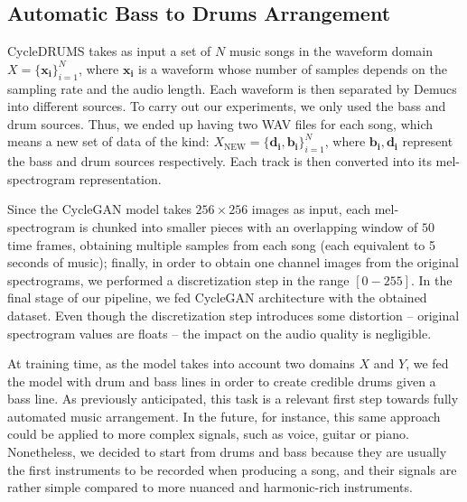 \documentclass[journal]{IEEEtran}
\begin{document}

\subsection{Automatic Bass to Drums Arrangement}

CycleDRUMS takes as input a set of $N$ music songs in the waveform domain $X = \{\mathbf{x_{i}}\}_{i=1}^{N}$, where $\mathbf{x_i}$ is a waveform whose number of samples depends on the sampling rate and the audio length. %
Each waveform is then separated by Demucs into different sources. To carry out our experiments, we only used the bass and drum sources. Thus, we ended up having two WAV files for each song, which means a new set of data of the kind: $X_{\text{NEW}} = \{\mathbf{d_{i}}, \mathbf{b_{i}}\}_{i=1}^{N}$, where $\mathbf{b_{i}}, \mathbf{d_{i}}$ represent the bass and drum sources respectively. Each track is then converted into its mel-spectrogram representation.

Since the CycleGAN model takes $256\times256$ images as input, each mel-spectrogram is chunked into smaller pieces with an overlapping window of $50$ time frames, obtaining multiple samples from each song (each equivalent to 5 seconds of music); finally, in order to obtain one channel images from the original spectrograms, we performed a discretization step in the range $[0-255]$. In the final stage of our pipeline, we fed CycleGAN architecture with the obtained dataset. Even though the discretization step introduces some distortion -- original spectrogram values are floats -- the impact on the audio quality is negligible. 

At training time, as the model takes into account two domains $X$ and $Y$, we fed the model with drum and bass lines in order to create credible drums given a bass line.
As previously anticipated, this task is a relevant first step towards fully automated music arrangement. In the future, for instance, this same approach could be applied to more complex signals, such as voice, guitar or piano. Nonetheless, we decided to start from drums and bass because they are usually the first instruments to be recorded when producing a song, and their signals are rather simple compared to more nuanced and harmonic-rich instruments. 
\end{document}
